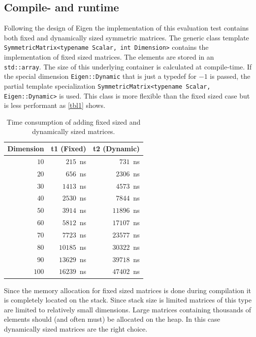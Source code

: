 \documentclass[a4wide]{scrartcl}
\begin{document}
\subsection{Compile- and runtime}
Following the design of Eigen the implementation of this evaluation test contains both fixed and dynamically sized symmetric matrices. The generic class template \texttt{SymmetricMatrix<typename Scalar, int Dimension>} contains the implementation of fixed sized matrices. The elements are stored in an \texttt{std::array}. The size of this underlying container is calculated at compile-time. \newline
If the special dimension \texttt{Eigen::Dynamic} that is just a typedef for $-1$ is passed, the partial template specialization \texttt{SymmetricMatrix<typename Scalar, Eigen::Dynamic>} is used. This class is more flexible than the fixed sized case but is less performant as \autoref{tbl1} shows.\newline\newline
\begin{table}
\centering
\begin{tabular}{r|r|r}
Dimension & t1 (Fixed)  & t2 (Dynamic)  \\ \hline \hline
$10$  & $215$~ns & $731$~ns \\
$20$  & $656$~ns & $2306$~ns \\
$30$  & $1413$~ns & $4573$~ns \\
$40$  & $2530$~ns & $7844$~ns \\
$50$  & $3914$~ns & $11896$~ns \\
$60$  & $5812$~ns & $17107$~ns \\
$70$  & $7723$~ns & $23577$~ns \\
$80$  & $10185$~ns & $30322$~ns \\
$90$  & $13629$~ns & $39718$~ns \\
$100$ & $16239$~ns & $47402$~ns
\end{tabular}
\caption{Time consumption of adding fixed sized and dynamically sized matrices.}
\label{tbl1}
\end{table}
Since the memory allocation for fixed sized matrices is done during compilation it is completely located on the stack. Since stack size is limited matrices of this type are limited to relatively small dimensions. Large matrices containing thousands of elements should (and often must) be allocated on the heap. In this case dynamically sized matrices are the right choice.
\end{document}
